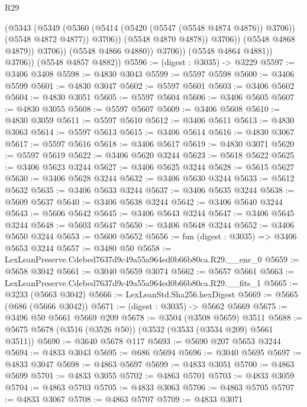 \begin{lexlean}{R29}
\begin{coremodule}
                              (@5343
                                (@5349
                                  (@5360
                                    (@5414 (@5420 (@5547 (@5548 @4874 @4876)) @3706))
                                    (@5548 @4872 @4877))
                                  @3706))
                              (@5548 @4870 @4878))
                            @3706))
                        (@5548 @4868 @4879))
                      @3706))
                  (@5548 @4866 @4880))
                @3706))
            (@5548 @4864 @4881))
          @3706))
      (@5548 @4857 @4882))
@5596 := (digest : @3035) -> @3229
@5597 := @3406 @3408
@5598 := @4830 @3043
@5599 := @5597 @5598
@5600 := @3406 @5599
@5601 := @4830 @3047
@5602 := @5597 @5601
@5603 := @3406 @5602
@5604 := @4830 @3051
@5605 := @5597 @5604
@5606 := @3406 @5605
@5607 := @4830 @3055
@5608 := @5597 @5607
@5609 := @3406 @5608
@5610 := @4830 @3059
@5611 := @5597 @5610
@5612 := @3406 @5611
@5613 := @4830 @3063
@5614 := @5597 @5613
@5615 := @3406 @5614
@5616 := @4830 @3067
@5617 := @5597 @5616
@5618 := @3406 @5617
@5619 := @4830 @3071
@5620 := @5597 @5619
@5622 := @3406 @5620 @3244
@5623 := @5618 @5622
@5625 := @3406 @5623 @3244
@5627 := @3406 @5625 @3244
@5628 := @5615 @5627
@5630 := @3406 @5628 @3244
@5632 := @3406 @5630 @3244
@5633 := @5612 @5632
@5635 := @3406 @5633 @3244
@5637 := @3406 @5635 @3244
@5638 := @5609 @5637
@5640 := @3406 @5638 @3244
@5642 := @3406 @5640 @3244
@5643 := @5606 @5642
@5645 := @3406 @5643 @3244
@5647 := @3406 @5645 @3244
@5648 := @5603 @5647
@5650 := @3406 @5648 @3244
@5652 := @3406 @5650 @3244
@5653 := @5600 @5652
@5656 := fun (digest : @3035) => @3406 @5653 @3244
@5657 := @3480 @50
@5658 := LexLeanPreserve.Cdebed7637d9c49a55a964ed0b66b80ca.R29.__enc_0
@5659 := @5658 @3042
@5661 := @3040 @5659 @3074
@5662 := @5657 @5661
@5663 := LexLeanPreserve.Cdebed7637d9c49a55a964ed0b66b80ca.R29.__fits_1
@5665 := @3233 (@5663 @3042)
@5666 := LexLeanStd.Sha256.hexDigest
@5669 := @5665 (@686 (@5666 @3042))
@5671 := (digest : @3035) -> @5662 @5669
@5675 := @3496 @50 @5661 @5669 @209
@5678 := @3504 (@3508 @5659) @3511
@5688 := @5675 @5678 (@3516 (@3526 @50)) (@3532 (@3533 (@3534 @209) @5661 @3511))
@5690 := @3640 @5678 @117
@5693 := @5690 @207 @5653 @3244
@5694 := @4833 @3043
@5695 := @686 @5694
@5696 := @3040 @5695
@5697 := @4833 @3047
@5698 := @4863 @5697
@5699 := @4833 @3051
@5700 := @4863 @5699
@5701 := @4833 @3055
@5702 := @4863 @5701
@5703 := @4833 @3059
@5704 := @4863 @5703
@5705 := @4833 @3063
@5706 := @4863 @5705
@5707 := @4833 @3067
@5708 := @4863 @5707
@5709 := @4833 @3071

\end{coremodule}
\end{lexlean}
